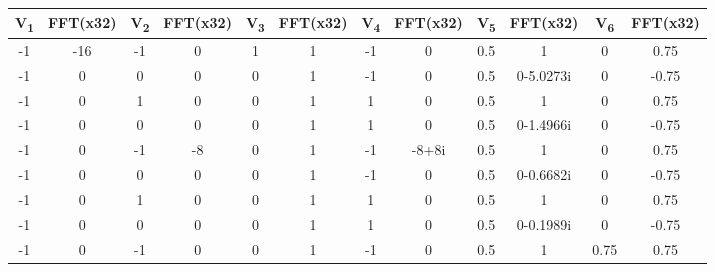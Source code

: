 \begin{table}[ht!]
    \centering %
    \begin{tabular}{|cc|cc|cc|cc|cc|cc|}
    \hline
      V\textsubscript{1} & FFT(x32) & V\textsubscript{2} & FFT(x32) & V\textsubscript{3} & FFT(x32) & V\textsubscript{4} & FFT(x32) & V\textsubscript{5} & FFT(x32)       & V\textsubscript{6} & FFT(x32) \\ \hline
            -1           &    -16   &          -1        &     0    &           1        &     1    &          -1        &     0    &          0.5       &     1          &          0         &   0.75   \\
            -1           &    0     &          0         &     0    &           0        &     1    &          -1        &     0    &          0.5       &     0-5.0273i  &          0         &  -0.75   \\
            -1           &    0     &          1         &     0    &           0        &     1    &           1        &     0    &          0.5       &     1          &          0         &   0.75   \\
            -1           &    0     &          0         &     0    &           0        &     1    &           1        &     0    &          0.5       &     0-1.4966i  &          0         &  -0.75   \\
            -1           &    0     &          -1        &     -8   &           0        &     1    &          -1        &    -8+8i &          0.5       &     1          &          0         &   0.75   \\
            -1           &    0     &          0         &     0    &           0        &     1    &          -1        &     0    &          0.5       &     0-0.6682i  &          0         &  -0.75   \\
            -1           &    0     &          1         &     0    &           0        &     1    &           1        &     0    &          0.5       &     1          &          0         &   0.75   \\
            -1           &    0     &          0         &     0    &           0        &     1    &           1        &     0    &          0.5       &     0-0.1989i  &          0         &  -0.75   \\
            -1           &    0     &          -1        &     0    &           0        &     1    &          -1        &     0    &          0.5       &     1          &          0.75      &   0.75   \\

\end{tabular}
\end{table}
